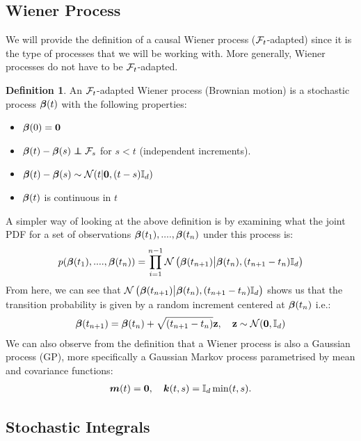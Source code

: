 \documentclass[a4paper,12pt,twoside,openright]{report}
\theoremstyle{definition}
\newtheorem{definition}{Definition}[section]
\begin{document}
\subsection{Wiener Process}

We will provide the definition of a causal Wiener process (${\mathcal{F}}_t$-adapted) since it is the type of processes that we will be working with. More generally, Wiener processes do not have to be ${\mathcal{F}}_t$-adapted.
\begin{definition}
    An ${\mathcal{F}}_t$-adapted Wiener process (Brownian motion) is a stochastic process ${\bm{\beta}}(t)$ with the following properties:
    \begin{itemize}
        \item ${\bm{\beta}}(0) = {\bm{0}}$
        \item  $\rvw(t) - \rvw(s) \independent \calF_s$  for $s < t$ (independent increments).
        \item ${\bm{\beta}}(t) - {\bm{\beta}}(s) \sim {\mathcal{N}} (t | {\bm{0}},  (t - s) {\mathbb{I}_d}) $
        \item ${\bm{\beta}}(t)$ is continuous in $t$
    \end{itemize}
\end{definition}
A simpler way of looking at the above definition is by examining what the joint PDF for a set of observations ${\bm{\beta}}(t_1), ...., {\bm{\beta}}(t_n)$ under this process is:
\begin{align*}
    p({\bm{\beta}}(t_1), ...., {\bm{\beta}}(t_n)) = \prod_{i=1}^{n-1} {\mathcal{N}}\left({\bm{\beta}}(t_{n+1})\big| {\bm{\beta}}(t_{n}), (t_{n+1}- t_{n}){\mathbb{I}_d} \right)
\end{align*}
From here, we can see that ${\mathcal{N}}\left({\bm{\beta}}(t_{n+1})\big| {\bm{\beta}}(t_{n}), (t_{n+1}- t_{n}){\mathbb{I}_d} \right)$ shows us that the transition probability is given by a random increment  centered at  ${\bm{\beta}}(t_{n})$ i.e.:
\begin{align*}
    {\bm{\beta}}(t_{n+1}) = {\bm{\beta}}(t_{n}) +  \sqrt{(t_{n+1}- t_{n})}{\mathbf{z}} , \quad {\mathbf{z}} \sim {\mathcal{N}}({\bm{0}}, {\mathbb{I}_d}) 
\end{align*}
We can also observe from the definition that a Wiener process is also a Gaussian process (GP), more specifically a Gaussian Markov process parametrised by mean and covariance functions:
\begin{align*}
    {\bm{m}}(t) = {\bm{0}}, \quad {\bm{k}}(t, s) = {\mathbb{I}_d}\min(t, s).
\end{align*}

\subsection{Stochastic Integrals}
\end{document}
